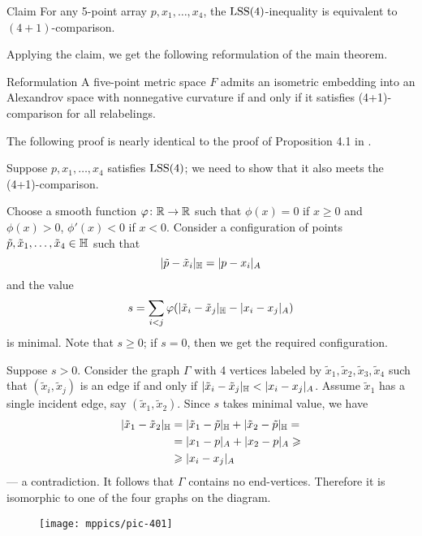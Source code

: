 \documentclass{article}
\begin{document}
\begin{thm}{Claim}\label{clm:(4+1)=LSS(4)}
For any 5-point array $p,x_1,\dots,x_4$, the
$\mathrm{LSS}(4)$-inequality is equivalent to $(4+1)$-comparison.
\end{thm}

Applying the claim, we get the following reformulation of the main theorem.

\begin{thm}{Reformulation}\label{thm:main-(4+1)}
A five-point metric space $F$ admits an isometric embedding into an Alexandrov space with nonnegative curvature
if and only if it satisfies (4+1)-comparison for all relabelings.
\end{thm}

The following proof is nearly identical to the proof of Proposition 4.1 in \cite{lebedeva-petrunin-zolotov}.

Suppose $p,x_1,\dots,x_4$ satisfies $\mathrm{LSS}(4)$;
we need to show that it also meets the (4+1)-comparison.

Choose a smooth function $\varphi\colon\mathbb{R}\to \mathbb{R}$ such that $\phi(x)=0$ if $x\ge0$ and $\phi(x)>0$, $\phi'(x)<0$ if $x<0$.
Consider a configuration of points $\tilde p,\tilde x_1,\dots,\tilde x_4\in \mathbb H$ such that 
\[
|\tilde p-\tilde x_i|_{\mathbb H}=|p-x_i|_{A}
\]
and the  value
\[
s=\sum_{i<j}\varphi(|\tilde x_i-\tilde x_j|_{\mathbb H}- |x_i-x_j|_{A})
\]
is minimal.
Note that $s\ge0$;
if $s=0$, then we get the required configuration.

Suppose $s>0$.
Consider the graph $\Gamma$ with 4 vertices labeled by $\tilde x_1,\tilde x_2,\tilde x_3,\tilde x_4$ such that 
$(\tilde x_i,\tilde x_j)$ is an edge if and only if $|\tilde x_i-\tilde x_j|_{\HH}<|x_i-x_j|_{A}$.
Assume $\tilde x_1$ has a single incident edge, say $(\tilde x_1,\tilde x_2)$.
Since $s$ takes minimal value, we have 
\begin{align*}
|\tilde x_1-\tilde x_2|_{\mathbb H}&=|\tilde x_1-\tilde p|_{\mathbb H}+|\tilde x_2-\tilde p|_{\mathbb H}=
\\
&=| x_1- p|_{A}+| x_2- p|_{A}\geqslant
\\
&\geqslant |x_i-x_j|_{A}
\end{align*}
--- a contradiction.
It follows that $\Gamma$ contains no end-vertices.
Therefore it is isomorphic to one of the four graphs on the diagram.

\begin{figure}[ht!]
\centering
\texttt{[image: mppics/pic-401]}
\end{figure}
\end{document}
